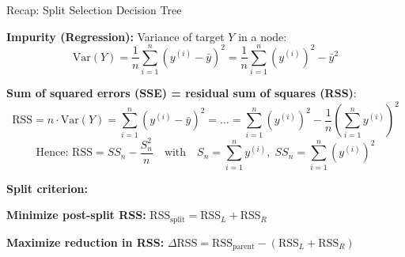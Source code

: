 \documentclass[10pt,compress,t,notes=noshow, xcolor=table]{beamer}
\begin{document}
\begin{framev}[align=top]{Recap: Split Selection Decision Tree}
\begin{itemizeM}
\item \textbf{Impurity (Regression):} Variance of target $Y$ in a node:
$$
\text{Var}(Y) = \frac{1}{n}\sum_{i=1}^n (y^{(i)} - \bar{y})^2 = \frac{1}{n} \sum_{i=1}^n (y^{(i)})^2 - \bar{y}^2
$$
\item \textbf{Sum of squared errors (SSE) = residual sum of squares (RSS)}:
$$
\text{RSS} 
= n \cdot \text{Var}(Y) = \sum_{i=1}^n (y^{(i)} - \bar{y})^2 = 
\dots = 
\sum_{i=1}^n (y^{(i)})^2 - \frac{1}{n} \left(\sum_{i=1}^n y^{(i)}\right)^2
$$
$$
\text{Hence: } \boxed{\text{RSS}=SS_{n}-\dfrac{S_{n}^{2}}{n}
\quad\text{with}\quad
S_{n}=\sum_{i=1}^{n}y^{(i)},\;
SS_{n}=\sum_{i=1}^{n}(y^{(i)})^{2}}
$$
\item \textbf{Split criterion:}
\begin{itemizeS}
\item \textbf{Minimize post-split RSS:} $\text{RSS}_{\text{split}} = \text{RSS}_L + \text{RSS}_R$
\item \textbf{Maximize reduction in RSS:} $\Delta \text{RSS} = \text{RSS}_{\text{parent}} - (\text{RSS}_L + \text{RSS}_R)$
\end{itemizeS}
\end{itemizeM}
\end{framev}
\end{document}
